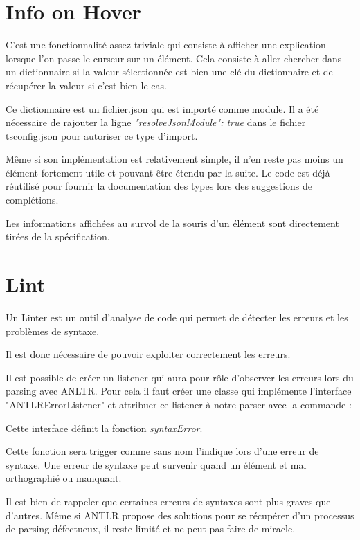 \documentclass[
    iict, %
    il, %
]{heig-tb}
\begin{document}
\section{Info on Hover}

C'est une fonctionnalité assez triviale qui consiste à afficher une explication lorsque l'on passe le curseur sur un élément.
Cela consiste à aller chercher dans un dictionnaire si la valeur sélectionnée est bien une clé du dictionnaire et de récupérer la valeur si c'est bien le cas.

Ce dictionnaire est un fichier.json qui est importé comme module. Il a été nécessaire de rajouter la ligne \emph{"resolveJsonModule": true} dans le fichier tsconfig.json pour autoriser ce type d'import.

Même si son implémentation est relativement simple, il n'en reste pas moins un élément fortement utile et pouvant être étendu par la suite.
Le code est déjà réutilisé pour fournir la documentation des types lors des suggestions de complétions.

Les informations affichées au survol de la souris d’un élément sont directement tirées de la spécification.

\section{Lint}


Un Linter est un outil d'analyse de code qui permet de détecter les erreurs et les problèmes de syntaxe.

Il est donc nécessaire de pouvoir exploiter correctement les erreurs.

Il est possible de créer un listener qui aura pour rôle d'observer les erreurs lors du parsing avec ANLTR.
Pour cela il faut créer une classe qui implémente l'interface "ANTLRErrorListener" et attribuer ce listener à notre parser
avec la commande :

Cette interface définit la fonction \emph{syntaxError}.

Cette fonction sera trigger comme sans nom l'indique lors d'une erreur de syntaxe.
Une erreur de syntaxe peut survenir quand un élément et mal orthographié ou manquant.

Il est bien de rappeler que certaines erreurs de syntaxes sont plus graves que d'autres.
Même si ANTLR propose des solutions pour se récupérer d'un processus de parsing défectueux, il reste limité et ne peut pas faire de miracle.
\end{document}
